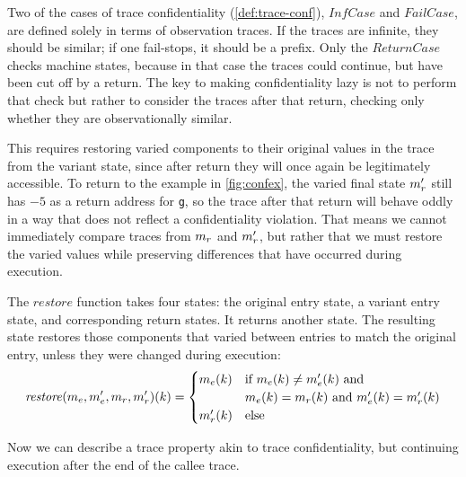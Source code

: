 \documentclass[acmsmall,review,anonymous]{acmart}\settopmatter{printfolios=true,printccs=false,printacmref=false}
\begin{document}
{      Two of the cases of trace confidentiality (\cref{def:trace-conf}), \(\mathit{InfCase}\)
      and \(\mathit{FailCase}\), are defined solely in terms of
      observation traces. If
      the traces are infinite, they should be similar; if one
      fail-stops, it should be a prefix. Only the
      \(\mathit{ReturnCase}\) checks machine states, because in that
      case the traces could continue, but have been cut off by a
      return. The key to making confidentiality lazy is not to perform that
      check but rather to consider the traces after that return,
      checking only whether they are observationally similar.

      This requires restoring varied components to their original
      values in the trace from the variant state, since after return
      they will once again be legitimately accessible. To return to
      the example in \cref{fig:confex}, the varied final state
      \(m_r'\) still has $-5$ as a return address for {\tt g}, so
      the trace after that return will behave oddly in a way that
      does not reflect a confidentiality violation.  That means we
      cannot immediately compare traces from \(m_r\) and
      \(m_r'\), but rather that we must restore the varied values
      while preserving differences that have occurred during
      execution.


      The \(\mathit{restore}\) function takes four states: the
      original entry state, a variant entry state, and corresponding return
      states. It returns another state. The resulting state restores those
      components that varied between entries to match the original entry,
      unless they were changed during execution:
      \[\mathit{restore}(m_e,m_e',m_r,m_r')
        (k) =
        \begin{cases}
          m_e(k) & \text{if } m_e(k) \not =
                                m_e'(k) \text { and } \\
          & m_e(k) = m_r(k) \text{ and }
            m_e'(k) = m_r'(k) \\
          m_r'(k) & \text{else} \\
        \end{cases}\]

      Now we can describe a trace property akin to trace confidentiality, but
      continuing execution after the end of the callee trace.

}
\end{document}
